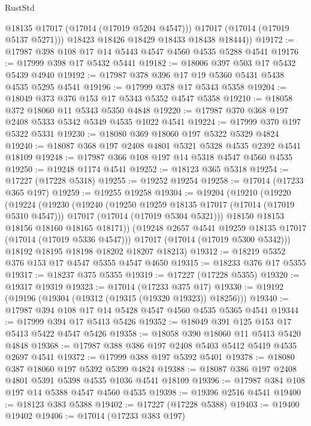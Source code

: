\begin{lexlean}{RustStd}
\begin{coremodule}
            @18135
            @17017
            (@17014 (@17019 @5204 @4547)))
          @17017
          (@17014 (@17019 @5137 @5271)))
        @18423
        @18426
        @18429
        @18433
        @18438
        @18444))
@19172 := @17987 @398 @108 @17 @14 @5443 @4547 @4560 @4535 @5288 @4541
@19176 := @17999 @398 @17 @5432 @5441
@19182 := @18006 @397 @503 @17 @5432 @5439 @4940
@19192 := @17987 @378 @396 @17 @19 @5360 @5431 @5438 @4535 @5295 @4541
@19196 := @17999 @378 @17 @5343 @5358
@19204 := @18049 @373 @376 @153 @17 @5343 @5352 @4547 @5358
@19210 := @18058 @372 @18060 @11 @5343 @5350 @4848
@19220 := @17987 @370 @368 @197 @2408 @5333 @5342 @5349 @4535 @1022 @4541
@19224 := @17999 @370 @197 @5322 @5331
@19230 := @18080 @369 @18060 @197 @5322 @5329 @4824
@19240 := @18087 @368 @197 @2408 @4801 @5321 @5328 @4535 @2392 @4541 @18109
@19248 := @17987 @366 @108 @197 @14 @5318 @4547 @4560 @4535
@19250 := @19248 @1174 @4541
@19252 := @18123 @365 @5318
@19254 := @17227 (@17228 @5318)
@19255 := @19252 @19254
@19258 := @17014 (@17233 @365 @197)
@19259 := @19255 @19258
@19304 := @19204
    (@19210
      (@19220
        (@19224
          (@19230
            (@19240
              (@19250 @19259 @18135 @17017 (@17014 (@17019 @5310 @4547)))
              @17017
              (@17014 (@17019 @5304 @5321)))
            @18150
            @18153
            @18156
            @18160
            @18165
            @18171))
        (@19248 @2657 @4541 @19259 @18135 @17017 (@17014 (@17019 @5336 @4547)))
        @17017
        (@17014 (@17019 @5300 @5342)))
      @18192
      @18195
      @18198
      @18202
      @18207
      @18213)
@19312 := @18219 @5352 @376 @153 @17 @4547 @5355 @4547 @4650
@19315 := @18233 @376 @17 @5355
@19317 := @18237 @375 @5355
@19319 := @17227 (@17228 @5355)
@19320 := @19317 @19319
@19323 := @17014 (@17233 @375 @17)
@19330 := @19192 (@19196 (@19304 (@19312 (@19315 (@19320 @19323)) @18256)))
@19340 := @17987 @394 @108 @17 @14 @5428 @4547 @4560 @4535 @5365 @4541
@19344 := @17999 @394 @17 @5413 @5426
@19352 := @18049 @391 @125 @153 @17 @5413 @5422 @4547 @5426
@19358 := @18058 @390 @18060 @11 @5413 @5420 @4848
@19368 := @17987 @388 @386 @197 @2408 @5403 @5412 @5419 @4535 @2697 @4541
@19372 := @17999 @388 @197 @5392 @5401
@19378 := @18080 @387 @18060 @197 @5392 @5399 @4824
@19388 := @18087 @386 @197 @2408 @4801 @5391 @5398 @4535 @1036 @4541 @18109
@19396 := @17987 @384 @108 @197 @14 @5388 @4547 @4560 @4535
@19398 := @19396 @2516 @4541
@19400 := @18123 @383 @5388
@19402 := @17227 (@17228 @5388)
@19403 := @19400 @19402
@19406 := @17014 (@17233 @383 @197)

\end{coremodule}
\end{lexlean}
